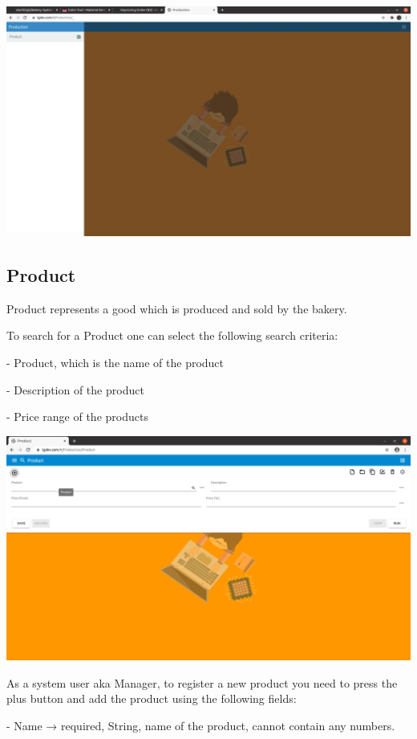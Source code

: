 \includegraphics[width=\textwidth]{sections/01-chapter/images/production.png}

\subsection{Product}

Product represents a good which is produced and sold by the bakery.

To search for a Product one can select the following search criteria:

- Product, which is the name of the product

- Description of the product

- Price range of the products

\includegraphics[width=\textwidth]{sections/01-chapter/images/product11.png}

As a system user aka Manager, to register a new product you need to press the plus button and add the product using the following fields:

- Name → required, String, name of the product, cannot contain any numbers.

